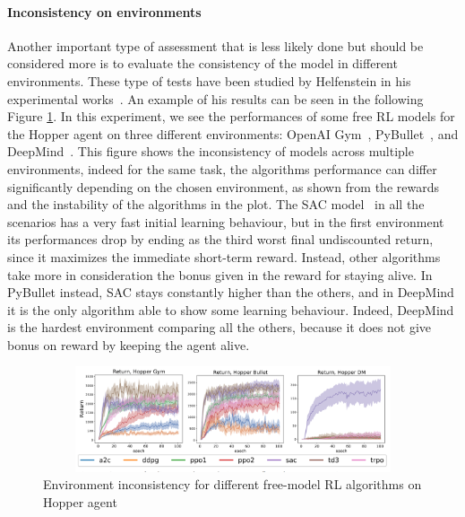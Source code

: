 \documentclass{article}
\begin{document}
\paragraph{Inconsistency on environments}
Another important type of assessment that is less likely done but should be considered more is to evaluate the consistency of the model in different environments. These type of tests have been studied by Helfenstein in his experimental works~\cite{BenchmarkingDRL}. An example of his results can be seen in the following Figure \ref{fig:env}. In this experiment, we see the performances of some free RL models for the Hopper agent on three different environments: OpenAI Gym~\cite{OpenAI}, PyBullet~\cite{Pybullet}, and DeepMind~\cite{DeepMind}. This figure shows the inconsistency of  models across multiple environments, indeed for the same task, the algorithms performance can differ significantly depending on the chosen environment, as shown from the rewards and the instability of the algorithms in the plot.
The SAC model~\cite{SAC} in all the scenarios has a very fast initial learning behaviour, but in the first environment its performances drop by ending as the third worst final undiscounted return, since it maximizes the immediate short-term reward. Instead, other algorithms take more in consideration the bonus given in the reward for staying alive. In PyBullet instead, SAC stays constantly higher than the others, and in DeepMind it is the only algorithm able to show some learning behaviour. Indeed, DeepMind is the hardest environment comparing all the others, because it does not give bonus on reward by keeping the agent alive.
\begin{figure}[!tp]
	\centering
	\includegraphics[width=15cm,height=3.1cm]{./images/Environements_plot.png}
	\caption{Environment inconsistency for different free-model RL algorithms on Hopper agent \cite{BenchmarkingDRL}}
	\label{fig:env}
	\footnotesize{}
\end{figure}
\end{document}
